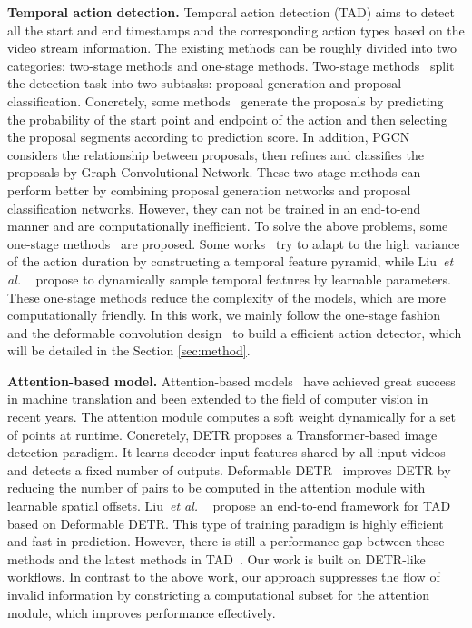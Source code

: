 \documentclass[runningheads]{llncs}
\def\etal{{\em et al. }}
\newcommand{\secref}[1]{Section \ref{#1}}
\newcommand{\myPara}[1]{\vspace{.05in}\noindent\textbf{#1}}
\begin{document}
\myPara{Temporal action detection.} Temporal action detection (TAD) aims to detect all the start and end timestamps and the corresponding action types based on the video stream information. The existing methods can be roughly divided into two categories: two-stage methods and one-stage methods. Two-stage methods~\cite{gao2018ctap,qing2021temporal,xu2020g,zeng2019graph,lin2019bmn,lin2018bsn,gao2017turn,lin2020fast} split the detection task into two subtasks: proposal generation and proposal classification. Concretely, some methods~\cite{lin2018bsn,lin2020fast,lin2019bmn} generate the proposals by predicting the probability of the start point and endpoint of the action and then selecting the proposal segments according to prediction score. In addition, PGCN~\cite{zeng2019graph} considers the relationship between proposals, then refines and classifies the proposals by Graph Convolutional Network. 
These two-stage methods can perform better by combining proposal generation networks and proposal classification networks. However, they can not be trained in an end-to-end manner and are computationally inefficient. To solve the above problems, some one-stage methods~\cite{lin2017single,chao2018rethinking,lin2021learning,long2019gaussian,xu2017r} are proposed.
Some works~\cite{chao2018rethinking,lin2021learning,yang2020revisiting} try to adapt to the high variance of the action duration by constructing a temporal feature pyramid, while Liu~\etal~\cite{liu2021end} propose to dynamically sample temporal features by learnable parameters. These one-stage methods reduce the complexity of the models, which are more computationally friendly. In this work, we mainly follow the one-stage fashion and the deformable convolution design~\cite{dai2017deformable,zhu2020deformable,liu2021end} to build a efficient action detector, which will be detailed in the \secref{sec:method}.

\myPara{Attention-based model.} 
Attention-based models~\cite{vaswani2017attention} have achieved great success in machine translation and been extended to the field of computer vision\cite{liu2021video,arnab2021vivit,liu2021swin,xu2021vitae,zhang2022vitaev2,chen2022dearkd} in recent years. The attention module computes a soft weight dynamically for a set of points at runtime. Concretely, DETR\cite{carion2020end} proposes a Transformer-based image detection paradigm. It learns decoder input features shared by all input videos and detects a fixed number of outputs. Deformable DETR~\cite{zhu2020deformable} improves DETR by reducing the number of pairs to be computed in the attention module with learnable spatial offsets. Liu~\etal~\cite{liu2021end} propose an end-to-end framework for TAD based on Deformable DETR. This type of training paradigm is highly efficient and fast in prediction. However, there is still a performance gap between these methods and the latest methods in TAD~\cite{liu2021end,zeng2019graph}. Our work is built on DETR-like workflows. In contrast to the above work, our approach suppresses the flow of invalid information by constricting a computational subset for the attention module, which improves performance effectively.
\end{document}
